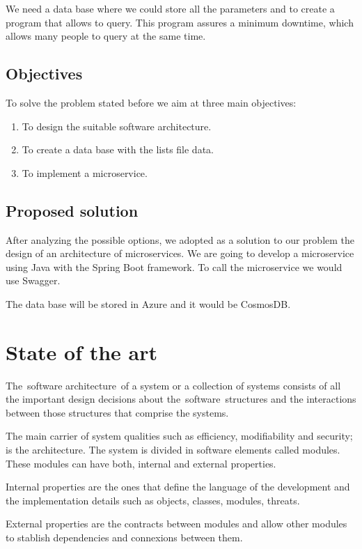 \documentclass[12pt]{report} %
\begin{document}
We need a data base where we could store all the parameters and to create a program that allows to query. This program assures a minimum downtime, which allows many people to query at the same time.

\subsection{Objectives}

To solve the problem stated before we aim at three main objectives:
\begin{enumerate}
	\item To design the suitable software architecture.
	\item To create a data base with the lists file data.
	\item To implement a microservice.
\end{enumerate}

\subsection{Proposed solution}
After analyzing the possible options, we adopted as a solution to our problem the design of an architecture of microservices. We are going to develop a microservice using Java with the Spring Boot framework. To call the microservice we would use Swagger. 

The data base will be stored in Azure and it would be CosmosDB.
\section{State of the art}

The software architecture of a system or a collection of systems consists of all the important design decisions about the software structures and the interactions between those structures that comprise the systems.

The main carrier of system qualities such as efficiency, modifiability and security; is the architecture. The system is divided in software elements called modules. These modules can have both, internal and external properties. 

Internal properties are the ones that define the language of the development and the implementation details such as objects, classes, modules, threats.

External properties are the contracts between modules and allow other modules to stablish dependencies and connexions between them. 
\end{document}

